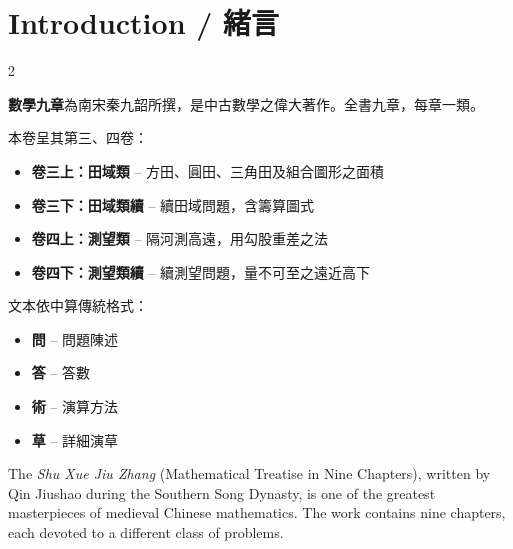 \documentclass[11pt,a4paper]{article}
\begin{document}
\tableofcontents
\newpage

\section*{Introduction / 緒言}

\begin{paracol}{2}

\begin{leftcolumn*}
\noindent\textbf{數學九章}為南宋秦九韶所撰，是中古數學之偉大著作。全書九章，每章一類。

本卷呈其第三、四卷：
\begin{itemize}[leftmargin=*,nosep]
  \item \textbf{卷三上：田域類} -- 方田、圓田、三角田及組合圖形之面積
  \item \textbf{卷三下：田域類續} -- 續田域問題，含籌算圖式
  \item \textbf{卷四上：測望類} -- 隔河測高遠，用勾股重差之法
  \item \textbf{卷四下：測望類續} -- 續測望問題，量不可至之遠近高下
\end{itemize}

文本依中算傳統格式：
\begin{itemize}[leftmargin=*,nosep]
  \item \textbf{問} -- 問題陳述
  \item \textbf{答} -- 答數
  \item \textbf{術} -- 演算方法
  \item \textbf{草} -- 詳細演草
\end{itemize}
\end{leftcolumn*}

\begin{rightcolumn}
The \textit{Shu Xue Jiu Zhang} (Mathematical Treatise in Nine Chapters), 
written by Qin Jiushao during the Southern Song Dynasty, 
is one of the greatest masterpieces of medieval Chinese mathematics. The work 
contains nine chapters, each devoted to a different class of problems.


\end{rightcolumn}
\end{paracol}
\end{document}

